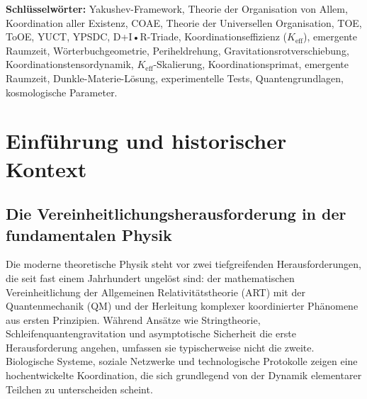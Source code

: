 \documentclass[11pt,a4paper]{article}
\begin{document}
\begin{abstract}
		Das Framework ist mikrokausal ($v \leq c$ immer), reproduziert die Allgemeine Relativitätstheorie und Quantenmechanik in validierten Grenzen, wenn die Koordinationseffizienz $K_{\mathrm{eff}} \to 1$, und liefert testbare Vorhersagen für Präzisionsmessungen in Astrophysik, Teilchenphysik und Quanteninformation.
		
		\vspace{0.5em}
		\noindent \textbf{Kernentdeckung:} 
		Wir identifizieren das axiomatische Rückgrat der Theorie als eine geschlossene \textbf{algebraische Schleife} fundamentaler Konstanten ($S_{\mathrm{odd}} = 6/5$, $S_{\mathrm{even}} = 4/5$), die den universellen Skalierungsexponenten $\beta = 2/3$ streng bestimmt. Wir zeigen, dass diese Schleife ein selbstkonsistentes, parameterfreies logisches System bildet. Die innere Konsistenz dieser Struktur wird durch eine emergente hochpräzise geometrische Koinzidenz eindrucksvoll bestätigt: $S_{\mathrm{odd}}\varphi^2 \approx \pi$ (Fehler $10^{-5}$), die das diskrete Massenspektrum der Fermionen direkt mit der kontinuierlichen Geometrie der Raumzeit verbindet. Dies etabliert YUCT nicht als phänomenologischen Fit, sondern als ein einheitliches, falsifizierbares axiomatisches Framework für die Koordinationsdynamik der Realität.
		
	\end{abstract}
	
	\noindent\textbf{Schlüsselwörter:} Yakushev-Framework, Theorie der Organisation von Allem, Koordination aller Existenz, COAE, Theorie der Universellen Organisation, TOE, ToOE, YUCT, YPSDC, D+I•R-Triade, Koordinationseffizienz ($K_{\mathrm{eff}}$), emergente Raumzeit, Wörterbuchgeometrie, Periheldrehung, Gravitationsrotverschiebung, Koordinationstensordynamik, $K_{\mathrm{eff}}$-Skalierung, Koordinationsprimat, emergente Raumzeit, Dunkle-Materie-Lösung, experimentelle Tests, Quantengrundlagen, kosmologische Parameter.
	\newpage
	\tableofcontents
	
	\newpage
	
	\section{Einführung und historischer Kontext}
	\subsection{Die Vereinheitlichungsherausforderung in der fundamentalen Physik}
	Die moderne theoretische Physik steht vor zwei tiefgreifenden Herausforderungen, die seit fast einem Jahrhundert ungelöst sind: der mathematischen Vereinheitlichung der Allgemeinen Relativitätstheorie (ART) mit der Quantenmechanik (QM) und der Herleitung komplexer koordinierter Phänomene aus ersten Prinzipien. Während Ansätze wie Stringtheorie, Schleifenquantengravitation und asymptotische Sicherheit die erste Herausforderung angehen, umfassen sie typischerweise nicht die zweite. Biologische Systeme, soziale Netzwerke und technologische Protokolle zeigen eine hochentwickelte Koordination, die sich grundlegend von der Dynamik elementarer Teilchen zu unterscheiden scheint.
	
\end{document}
